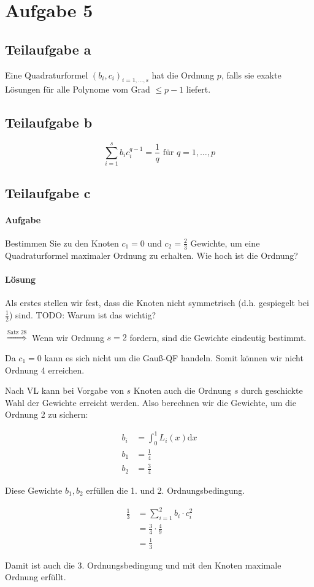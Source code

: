 \section*{Aufgabe 5}
\subsection*{Teilaufgabe a}
Eine Quadraturformel $(b_i, c_i)_{i=1, \dots, s}$ hat die Ordnung
$p$, falls sie exakte Lösungen für alle Polynome vom Grad $\leq p -1$
liefert.

\subsection*{Teilaufgabe b}
\[\sum_{i=1}^s b_i c_i^{q-1} = \frac{1}{q} \text{ für } q = 1, \dots, p\]

\subsection*{Teilaufgabe c}
\paragraph{Aufgabe} Bestimmen Sie zu den Knoten $c_1 = 0$ und $c_2 = \frac{2}{3}$ Gewichte, um eine Quadraturformel
maximaler Ordnung zu erhalten. Wie hoch ist die Ordnung?

\paragraph{Lösung}

Als erstes stellen wir fest, dass die Knoten nicht symmetrisch (d.h. 
gespiegelt bei $\frac{1}{2}$) sind. TODO: Warum ist das wichtig?

$\stackrel{\text{Satz 28}}{\Rightarrow}$ Wenn wir Ordnung $s = 2$ fordern, sind die Gewichte eindeutig bestimmt.

Da $c_1 = 0$ kann es sich nicht um die Gauß-QF handeln. Somit können 
wir nicht Ordnung 4  erreichen.

Nach VL kann bei Vorgabe von $s$ Knoten auch die Ordnung $s$ durch 
geschickte Wahl der Gewichte erreicht werden. 
Also berechnen wir die Gewichte, um die Ordnung 2 zu sichern:

\begin{align}
	b_i &= \int_0^1 L_i(x) \mathrm{d}x\\
	b_1 &= \frac{1}{4}\\
	b_2 &= \frac{3}{4}
\end{align}

Diese Gewichte $b_1, b_2$ erfüllen die 1. und 2. Ordnungsbedingung.

\begin{align}
	\frac{1}{3} &= \sum_{i=1}^2 b_i \cdot c_i^2\\
			&= \frac{3}{4} \cdot \frac{4}{9}\\
			&= \frac{1}{3}
\end{align}

Damit ist auch die 3. Ordnungsbedingung und mit den Knoten maximale Ordnung erfüllt.
